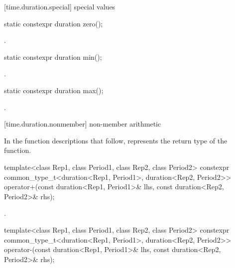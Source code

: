 [time.duration.special]{ special values}

%
\begin{itemdecl}
static constexpr duration zero();
\end{itemdecl}

\begin{itemdescr}
\pnum
\returns {}.
\end{itemdescr}

%
\begin{itemdecl}
static constexpr duration min();
\end{itemdecl}

\begin{itemdescr}
\pnum
\returns {}.
\end{itemdescr}

%
\begin{itemdecl}
static constexpr duration max();
\end{itemdecl}

\begin{itemdescr}
\pnum
\returns {}.
\end{itemdescr}

[time.duration.nonmember]{ non-member arithmetic}

\pnum
In the function descriptions that follow,  represents the return type
of the function.

%
\begin{itemdecl}
template<class Rep1, class Period1, class Rep2, class Period2>
  constexpr common_type_t<duration<Rep1, Period1>, duration<Rep2, Period2>>
    operator+(const duration<Rep1, Period1>& lhs, const duration<Rep2, Period2>& rhs);
\end{itemdecl}

\begin{itemdescr}
\pnum
\returns {}.
\end{itemdescr}

%
\begin{itemdecl}
template<class Rep1, class Period1, class Rep2, class Period2>
  constexpr common_type_t<duration<Rep1, Period1>, duration<Rep2, Period2>>
  operator-(const duration<Rep1, Period1>& lhs, const duration<Rep2, Period2>& rhs);
\end{itemdecl}

